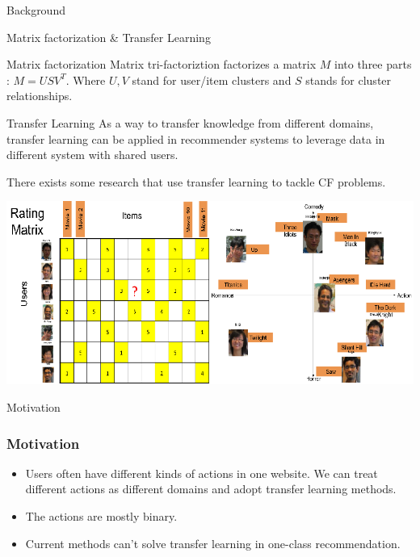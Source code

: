 \documentclass[xetex,mathserif,serif]{beamer}
\begin{document}
\begin{section}{Background}
\begin{frame}{Matrix factorization \& Transfer Learning}
\begin{block}{Matrix factorization}
      \alert{Matrix tri-factoriztion} factorizes a matrix $M$ into three parts : $M = USV^T$. Where $U,V$ stand for user/item clusters and $S$ stands for cluster relationships.
    \end{block}

    \begin{block}{Transfer Learning}
      As a way to transfer knowledge from different domains, transfer learning can be applied in recommender systems to leverage data in different system with shared users.

      There exists some research that use transfer learning to tackle CF problems.
    \end{block}
  \end{frame}

  \begin{frame}
    \begin{center}
      \includegraphics[width=\textwidth]{fig/pmf.png}
    \end{center}
  \end{frame}

\end{section}

\begin{section}{Motivation}
  \begin{frame}
    \frametitle{Motivation}
    \begin{itemize}
    \item Users often have different kinds of actions in one website. We can treat different actions as different domains and adopt transfer learning methods.
    \item The actions are mostly binary.
    \item Current methods can't solve transfer learning in one-class recommendation.
    \end{itemize}
  \end{frame}
\end{section}
\end{document}

